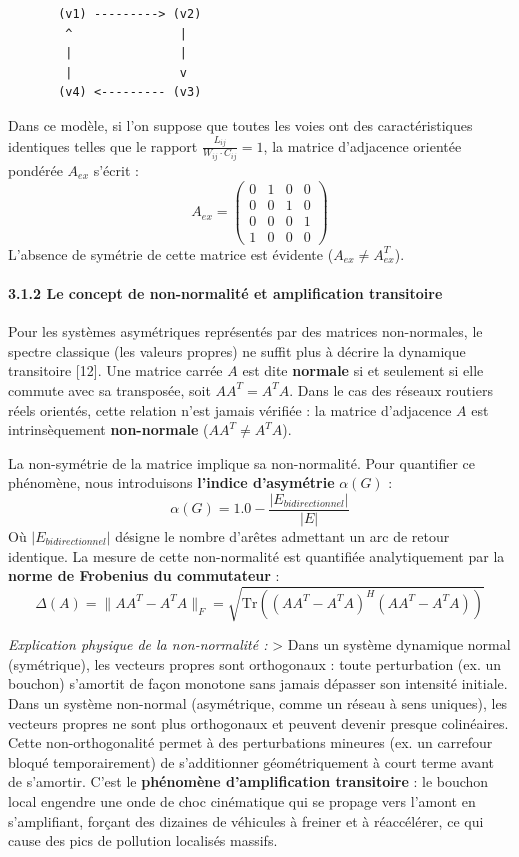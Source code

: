 \documentclass[10pt, a4paper]{article}
\begin{document}
\begin{verbatim}
       (v1) ---------> (v2)
        ^               |
        |               |
        |               v
       (v4) <--------- (v3)
\end{verbatim}

Dans ce modèle, si l'on suppose que toutes les voies ont des
caractéristiques identiques telles que le rapport
\(\frac{L_{ij}}{W_{ij} \cdot C_{ij}} = 1\), la matrice d'adjacence
orientée pondérée \(A_{ex}\) s'écrit : \[A_{ex} = \begin{pmatrix}
0 & 1 & 0 & 0 \\
0 & 0 & 1 & 0 \\
0 & 0 & 0 & 1 \\
1 & 0 & 0 & 0
\end{pmatrix}\] L'absence de symétrie de cette matrice est évidente
(\(A_{ex} \neq A_{ex}^T\)).

\paragraph{3.1.2 Le concept de non-normalité et amplification
transitoire}\label{le-concept-de-non-normalituxe9-et-amplification-transitoire}

Pour les systèmes asymétriques représentés par des matrices
non-normales, le spectre classique (les valeurs propres) ne suffit plus
à décrire la dynamique transitoire {[}12{]}. Une matrice carrée \(A\)
est dite \textbf{normale} si et seulement si elle commute avec sa
transposée, soit \(A A^T = A^T A\). Dans le cas des réseaux routiers
réels orientés, cette relation n'est jamais vérifiée : la matrice
d'adjacence \(A\) est intrinsèquement \textbf{non-normale}
(\(A A^T \neq A^T A\)).

La non-symétrie de la matrice implique sa non-normalité. Pour quantifier
ce phénomène, nous introduisons \textbf{l'indice d'asymétrie}
\(\alpha(G)\) : \[\alpha(G) = 1.0 - \frac{|E_{bidirectionnel}|}{|E|}\]
Où \(|E_{bidirectionnel}|\) désigne le nombre d'arêtes admettant un arc
de retour identique. La mesure de cette non-normalité est quantifiée
analytiquement par la \textbf{norme de Frobenius du commutateur} :
\[\Delta(A) = \| A A^T - A^T A \|_F = \sqrt{\text{Tr}\left( (A A^T - A^T A)^H (A A^T - A^T A) \right)}\]

\emph{Explication physique de la non-normalité :} \textgreater{} Dans un
système dynamique normal (symétrique), les vecteurs propres sont
orthogonaux : toute perturbation (ex. un bouchon) s'amortit de façon
monotone sans jamais dépasser son intensité initiale. Dans un système
non-normal (asymétrique, comme un réseau à sens uniques), les vecteurs
propres ne sont plus orthogonaux et peuvent devenir presque colinéaires.
Cette non-orthogonalité permet à des perturbations mineures (ex. un
carrefour bloqué temporairement) de s'additionner géométriquement à
court terme avant de s'amortir. C'est le \textbf{phénomène
d'amplification transitoire} : le bouchon local engendre une onde de
choc cinématique qui se propage vers l'amont en s'amplifiant, forçant
des dizaines de véhicules à freiner et à réaccélérer, ce qui cause des
pics de pollution localisés massifs.
\end{document}
